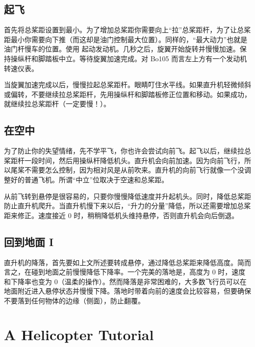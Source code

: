 
\section{起飞}

首先将总桨距设置到最小。为了增加总桨距你需要向上“拉”总桨距杆，为了让总桨距最小你需要向下推（而这却是油门控制最大位置）。同样的，“最大动力”也就是油门杆慢车的位置。使用 \key{\}} 起动发动机。几秒之后，旋翼开始旋转并慢慢加速。保持操纵杆和脚踏板中立。等待旋翼加速完成。对 Bo105 而言左上方有一个发动机转速仪表。

当旋翼加速完成以后，慢慢拉起总桨距杆。眼睛叮住水平线。如果直升机轻微倾斜或偏转，不要继续拉总桨距杆，先用操纵杆和脚踏板修正位置和移动。如果成功，就继续拉总桨距杆（一定要慢！）。

\section{在空中}

为了防止你的失望情绪，先不学平飞，你也许会尝试向前飞。起飞以后，继续拉总桨距杆一段时间，然后用操纵杆降低机头。直升机会向前加速。因为向前飞行，所以尾桨不需要怎么控制，因为相对风是从前吹来。直升机的向前飞行就像一个没调整好的普通飞机。所谓“中立”位取决于空速和总桨距。

从前飞转到悬停是很容易的，只要你慢慢降低速度并升起机头。同时，降低总桨距防止直升机爬升。当直升机慢下来以后，“升力的分量”降低，所以还需要增加总桨距来修正。速度接近 0 时，稍稍降低机头维持悬停，否则直升机会向后倒退。

\section{回到地面 I}

直升机的降落，首先要如上文所述要转成悬停，通过降低总桨距来降低高度。简而言之，在碰到地面之前慢慢降低下降率。一个完美的落地是，高度为 0 时，速度和下降率也变为 0（温柔的操作）。然而降落是非常困难的，大多数飞行员可以在地面附近进入悬停状态并慢慢下降。落地时带着向前的速度会比较容易，但要确保不要落到任何物体的边缘（侧面），防止翻覆。



\iffalse
\chapter{A Helicopter Tutorial}
\label{helicopter}

